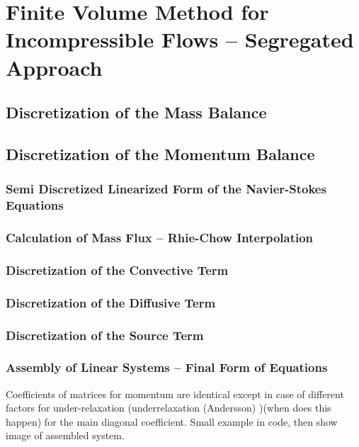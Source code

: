   \section{Finite Volume Method for Incompressible Flows -- Segregated Approach}

    \subsection{Discretization of the Mass Balance}

    \subsection{Discretization of the Momentum Balance}
      
      \subsubsection{Semi Discretized Linearized Form of the Navier-Stokes Equations}

      \subsubsection{Calculation of Mass Flux -- Rhie-Chow Interpolation}

      \subsubsection{Discretization of the Convective Term}

      \subsubsection{Discretization of the Diffusive Term}

      \subsubsection{Discretization of the Source Term}

      \subsubsection{Assembly of Linear Systems -- Final Form of Equations}
        Coefficients of matrices for momentum are identical except in case of different factors for under-relaxation (underrelaxation (Andersson) )(when does this happen) for the main diagonal coefficient. Small example in code, then show image of assembled system.

